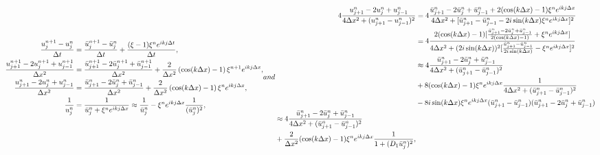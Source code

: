 \begin{subequations}
	\begin{align}
	\frac{u^{n+1}_j - u^n_j}{\Delta t} 
&= \frac{\bar u^{n+1}_j - \bar u^n_j}{\Delta t} 
+ \frac{(\xi - 1)\xi^n e^{ikj\Delta t}}{\Delta t}, 
\\
 \frac{u^{n+1}_{j+1} - 2u^{n+1}_j + u^{n+1}_{j-1}}{\Delta x^2}
&= \frac{\bar u^{n+1}_{j+1} - 2\bar u^{n+1}_j + \bar u^{n+1}_{j-1}}{\Delta x^2}
+ \frac{2}{\Delta x^2}\left(\cos(k\Delta x) - 1\right) \xi^{n+1} e^{ikj\Delta x},
\\
	\frac{u^n_{j+1} - 2u^n_j + u^n_{j-1}}{\Delta x^2}
&= \frac{\bar u^n_{j+1} - 2\bar u^n_j + \bar u^n_{j-1}}{\Delta x^2} 
+ \frac{2}{\Delta x^2}\left(\cos(k\Delta x)-1\right) \xi^n e^{ikj\Delta x},
\\
	\frac{1}{u^n_j} 
&= \frac{1}{\bar u^n_j + \xi^n e^{ikj\Delta x}} 
\approx \frac{1}{\bar u^n_j} - \xi^n e^{ikj\Delta x} \frac{1}{(\bar u^n_j)^2},
	\end{align}
and 
\begin{align}
4\frac{u^n_{j+1} - 2u^n_j + u^n_{j-1}}{4\Delta x^2 + (u^n_{j+1} - u^n_{j-1})^2} 
&= 4\frac{\bar u^n_{j+1} - 2\bar u^n_j + \bar u^n_{j-1} + 2(\cos(k\Delta x)-1)\xi^ne^{ikj\Delta x}}{4\Delta x^2 + [\bar u^n_{j+1} - \bar u^n_{j-1} - 2i\sin(k\Delta x)\xi^ne^{ikj\Delta x}]^2}
\notag
\\
&= 4\frac{2(\cos(k\Delta x)-1)[\frac{\bar u^n_{j+1} - 2\bar u^n_j + \bar u^n_{j-1}}{2(\cos(k\Delta x)-1)} + \xi^n e^{ikj\Delta x}]}{4\Delta x^2 + (2i\sin(k\Delta x))^2[\frac{\bar u^n_{j+1} - \bar u^n_{j-1}}{2i\sin(k\Delta x)} - \xi^n e^{ikj\Delta x}]^2}
\notag\\
&\approx 4\frac{\bar u^n_{j+1} - 2\bar u^n_{j} + \bar u^n_{j-1}}{4\Delta x^2 + (\bar u^n_{j+1} - \bar u^n_{j-1})^2}
\notag\\
&+ 8(\cos(k\Delta x)-1)\xi^ne^{ikj\Delta x}\frac{1}{4\Delta x^2 + (\bar u^n_{j+1} - \bar u^n_{j-1})^2}
\notag\\ 
&-8i\sin(k\Delta x)\xi^ne^{ikj\Delta x}(\bar u^n_{j+1} - \bar u^n_{j-1})(\bar u^n_{j+1} - 2\bar u^n_{j} + \bar u^n_{j-1}) 
\notag\\
\begin{split} 
&\approx 4\frac{\bar u^n_{j+1} - 2\bar u^n_{j} + \bar u^n_{j-1}}{4\Delta x^2 + (\bar u^n_{j+1} - \bar u^n_{j-1})^2}
\\
&+ \frac{2}{\Delta x^2}(\cos(k\Delta x)-1)\xi^ne^{ikj\Delta x} \frac{1}{1 + (
	D_1 \bar u^n_j
	)^2},
\end{split}
\end{align}
\label{ammc_von_neumann}
\end{subequations}
